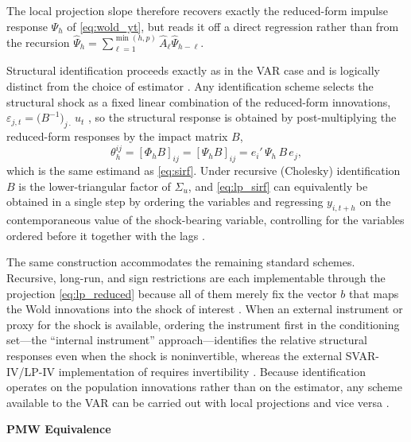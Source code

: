 The local projection slope therefore recovers exactly the reduced-form
impulse response $\Psi_h$ of \eqref{eq:wold_yt}, but reads it off a direct
regression rather than from the recursion $\hat{\Psi}_h = \sum_{\ell=1}^{\min(h,p)}
\hat{A}_\ell \hat{\Psi}_{h-\ell}$.


Structural identification proceeds exactly as in the VAR case and is
logically distinct from the choice of estimator
\parencite{plagborg2021local}. Any identification scheme selects the
structural shock as a fixed linear combination of the reduced-form
innovations, $\varepsilon_{j,t} = \bigl(B^{-1}\bigr)_{j\cdot}\, u_t$
\parencite[p.~967]{plagborg2021local}, so the structural response is obtained
by post-multiplying the reduced-form responses by the impact matrix $B$,
%
\begin{equation}
    \theta_h^{ij} = [\Phi_h B]_{ij} = [\Psi_h B]_{ij}
                  = e_i'\, \Psi_h\, B\, e_j,
    \label{eq:lp_sirf}
\end{equation}
%
which is the same estimand as \eqref{eq:sirf}. Under recursive
(Cholesky) identification $B$ is the lower-triangular factor of $\Sigma_u$,
and \eqref{eq:lp_sirf} can equivalently be obtained in a single step by
ordering the variables and regressing $y_{i,t+h}$ on the contemporaneous
value of the shock-bearing variable, controlling for the variables ordered
before it together with the lags \parencites{jorda2005estimation}{plagborg2021local}.
 
The same construction accommodates the remaining standard schemes. Recursive, long-run, and sign restrictions are each implementable through the projection \eqref{eq:lp_reduced} because all of them merely fix the vector $b$ that maps the Wold innovations into the shock of interest
\parencite[p.~967]{plagborg2021local}. When an external instrument or proxy for the shock is available, ordering the instrument first in the conditioning set---the ``internal instrument'' approach---identifies the relative structural responses even when the shock is noninvertible, whereas the external SVAR-IV/LP-IV implementation of \textcite{stock2018identification} requires invertibility \parencite[p.~973]{plagborg2021local}. Because identification operates on the population innovations rather than on the estimator, any scheme available to the VAR can be carried out with local projections and vice versa \parencite[p.~975]{plagborg2021local}.

\textbf{PMW Equivalence}

